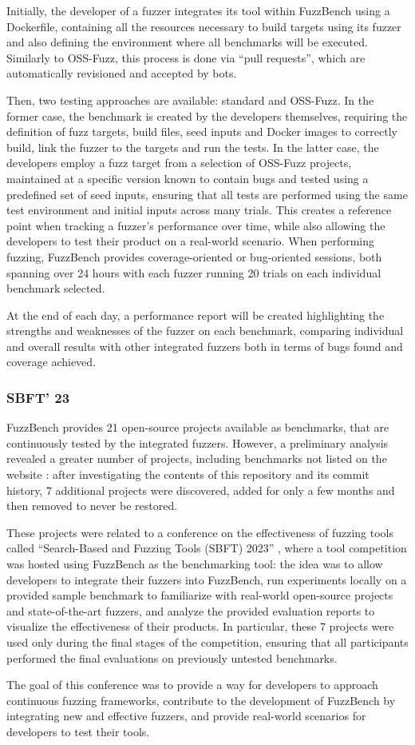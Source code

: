 Initially, the developer of a fuzzer integrates its tool within FuzzBench using a Dockerfile, containing all the resources necessary to build targets using its fuzzer and also defining the environment where all benchmarks will be executed. Similarly to OSS-Fuzz, this process is done via ``pull requests'', which are automatically revisioned and accepted by bots.

Then, two testing approaches are available: standard and OSS-Fuzz. In the former case, the benchmark is created by the developers themselves, requiring the definition of fuzz targets, build files, seed inputs and Docker images to correctly build, link the fuzzer to the targets and run the tests. In the latter case, the developers employ a fuzz target from a selection of OSS-Fuzz projects, maintained at a specific version known to contain bugs \cite{benchmarks} and tested using a predefined set of seed inputs, ensuring that all tests are performed using the same test environment and initial inputs across many trials. This creates a reference point when tracking a fuzzer's performance over time, while also allowing the developers to test their product on a real-world scenario. When performing fuzzing, FuzzBench provides coverage-oriented or bug-oriented sessions, both spanning over 24 hours with each fuzzer running 20 trials on each individual benchmark selected.

At the end of each day, a performance report will be created highlighting the strengths and weaknesses of the fuzzer on each benchmark, comparing individual and overall results with other integrated fuzzers both in terms of bugs found and coverage achieved.



\subsubsection{SBFT' 23} \label{conference}
FuzzBench provides 21 open-source projects available as benchmarks, that are continuously tested by the integrated fuzzers. However, a preliminary analysis revealed a greater number of projects, including benchmarks not listed on the website \cite{benchmarks}: after investigating the contents of this repository and its commit history, 7 additional projects were discovered, added for only a few months and then removed to never be restored.  

These projects were related to a conference on the effectiveness of fuzzing tools called ``Search-Based and Fuzzing Tools (SBFT) 2023'' \cite{sbft23}, where a tool competition was hosted using FuzzBench as the benchmarking tool: the idea was to allow developers to integrate their fuzzers into FuzzBench, run experiments locally on a provided sample benchmark to familiarize with real-world open-source projects and state-of-the-art fuzzers, and analyze the provided evaluation reports to visualize the effectiveness of their products. In particular, these 7 projects were used only during the final stages of the competition, ensuring that all participants performed the final evaluations on previously untested benchmarks.

The goal of this conference was to provide a way for developers to approach continuous fuzzing frameworks, contribute to the development of FuzzBench by integrating new and effective fuzzers, and provide real-world scenarios for developers to test their tools.